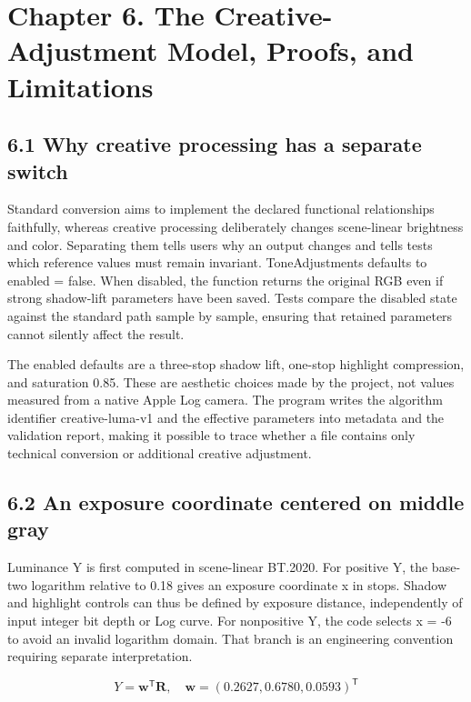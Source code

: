 \documentclass[11pt,a4paper,openany]{book}
\begin{document}
\chapter*{Chapter 6. The Creative-Adjustment Model, Proofs, and Limitations}

\section*{6.1 Why creative processing has a separate switch}
Standard conversion aims to implement the declared functional relationships faithfully, whereas creative processing deliberately changes scene-linear brightness and color. Separating them tells users why an output changes and tells tests which reference values must remain invariant. ToneAdjustments defaults to enabled = false. When disabled, the function returns the original RGB even if strong shadow-lift parameters have been saved. Tests compare the disabled state against the standard path sample by sample, ensuring that retained parameters cannot silently affect the result.

The enabled defaults are a three-stop shadow lift, one-stop highlight compression, and saturation 0.85. These are aesthetic choices made by the project, not values measured from a native Apple Log camera. The program writes the algorithm identifier creative-luma-v1 and the effective parameters into metadata and the validation report, making it possible to trace whether a file contains only technical conversion or additional creative adjustment.


\section*{6.2 An exposure coordinate centered on middle gray}
Luminance Y is first computed in scene-linear BT.2020. For positive Y, the base-two logarithm relative to 0.18 gives an exposure coordinate x in stops. Shadow and highlight controls can thus be defined by exposure distance, independently of input integer bit depth or Log curve. For nonpositive Y, the code selects x = -6 to avoid an invalid logarithm domain. That branch is an engineering convention requiring separate interpretation.


\begin{equation}
Y=\mathbf{w}^{\mathsf T}\mathbf{R},\quad \mathbf{w}=(0.2627,0.6780,0.0593)^{\mathsf T}
\end{equation}
\end{document}
